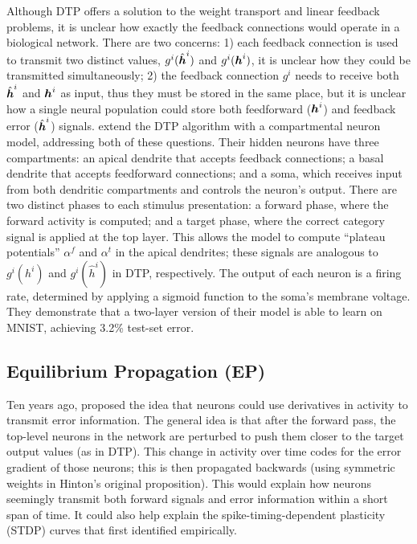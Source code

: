 Although DTP offers a solution to the weight transport
and linear feedback problems,
it is unclear how exactly the feedback connections would operate
in a biological network.
There are two concerns:
1) each feedback connection is used to transmit two distinct values,
$g^i(\hat{\boldsymbol{h}}^i)$ and $g^i(\boldsymbol{h}^i)$,
it is unclear how they could be transmitted simultaneously;
2) the feedback connection $g^i$ needs to receive both
$\hat{\boldsymbol{h}}^i$ and $\boldsymbol{h}^i$ as input,
thus they must be stored in the same place,
but it is unclear how a single neural population
could store both feedforward ($\boldsymbol{h}^i$) and feedback error ($\hat{\boldsymbol{h}}^i$)
signals.
\textcite{Guergiuev2017} extend the DTP algorithm
with a compartmental neuron model,
addressing both of these questions.
Their hidden neurons have three compartments:
an apical dendrite that accepts feedback connections;
a basal dendrite that accepts feedforward connections;
and a soma, which receives input from both dendritic compartments
and controls the neuron's output.
There are two distinct phases to each stimulus presentation:
a forward phase, where the forward activity is computed;
and a target phase, where the correct category signal
is applied at the top layer.
This allows the model to compute ``plateau potentials'' $\alpha^f$ and $\alpha^t$
in the apical dendrites;
these signals are analogous to $g^i(h^i)$ and $g^i(\hat h^i)$
in DTP, respectively.
The output of each neuron is a firing rate,
determined by applying a sigmoid function to the soma's membrane voltage.
They demonstrate that a two-layer version of their model
is able to learn on MNIST,
achieving 3.2\% test-set error.


\subsection{Equilibrium Propagation (EP)}

Ten years ago, \textcite{Hinton2007} proposed the idea that
neurons could use derivatives in activity to transmit error information.
The general idea is that after the forward pass,
the top-level neurons in the network are perturbed
to push them closer to the target output values (as in DTP).
This change in activity over time codes for the error gradient of those neurons;
this is then propagated backwards
(using symmetric weights in Hinton's original proposition).
This would explain how neurons seemingly transmit both
forward signals and error information within a short span of time.
It could also help explain the spike-timing-dependent plasticity (STDP)
curves that \textcite{Bi1998} first identified empirically.

